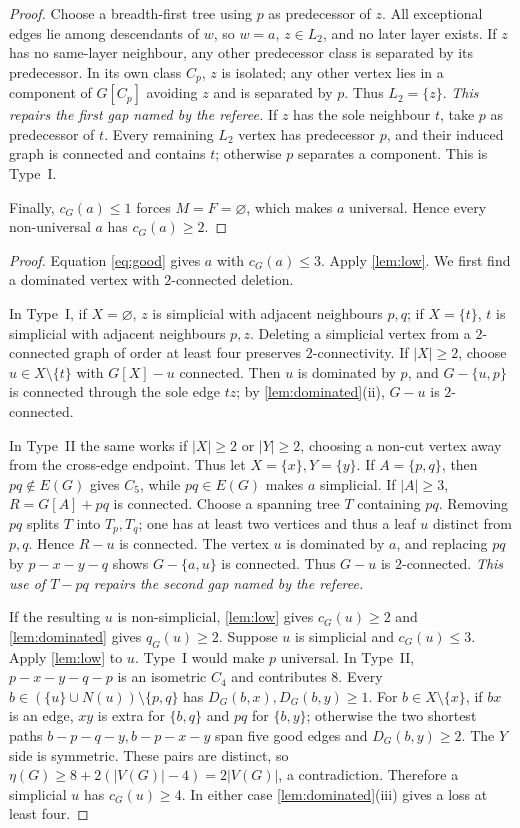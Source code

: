 \documentclass[11pt,a4paper]{article}
\theoremstyle{plain}
\theoremstyle{definition}
\theoremstyle{remark}
\begin{document}
\begin{proof}
Choose a breadth-first tree using $p$ as predecessor of $z$. All
exceptional edges lie among descendants of $w$, so $w=a$, $z\in L_2$,
and no later layer exists. If $z$ has no same-layer neighbour, any other
predecessor class is separated by its predecessor. In its own class
$C_p$, $z$ is isolated; any other vertex lies in a component of
$G[C_p]$ avoiding $z$ and is separated by $p$. Thus $L_2=\{z\}$.
\emph{This repairs the first gap named by the referee.}
If $z$ has the sole neighbour $t$, take $p$ as predecessor of $t$.
Every remaining $L_2$ vertex has predecessor $p$, and their induced
graph is connected and contains $t$; otherwise $p$ separates a component.
This is Type~I.

Finally, $c_G(a)\le1$ forces $M=F=\varnothing$, which makes $a$
universal. Hence every non-universal $a$ has $c_G(a)\ge2$.
\end{proof}

\label{pf:reduction}
\propreduction*
\begin{proof}
Equation \eqref{eq:good} gives $a$ with $c_G(a)\le3$. Apply
\cref{lem:low}. We first find a dominated vertex with $2$-connected
deletion.

In Type~I, if $X=\varnothing$, $z$ is simplicial with adjacent neighbours
$p,q$; if $X=\{t\}$, $t$ is simplicial with adjacent neighbours $p,z$.
Deleting a simplicial vertex from a $2$-connected graph of order at least
four preserves $2$-connectivity. If $|X|\ge2$, choose
$u\in X\setminus\{t\}$ with $G[X]-u$ connected. Then $u$ is dominated by
$p$, and $G-\{u,p\}$ is connected through the sole edge $tz$; by
\cref{lem:dominated}(ii), $G-u$ is $2$-connected.

In Type~II the same works if $|X|\ge2$ or $|Y|\ge2$, choosing a non-cut
vertex away from the cross-edge endpoint. Thus let $X=\{x\},Y=\{y\}$.
If $A=\{p,q\}$, then $pq\notin E(G)$ gives $C_5$, while $pq\in E(G)$
makes $a$ simplicial. If $|A|\ge3$, $R=G[A]+pq$ is connected. Choose a
spanning tree $T$ containing $pq$. Removing $pq$ splits $T$ into
$T_p,T_q$; one has at least two vertices and thus a leaf $u$ distinct
from $p,q$. Hence $R-u$ is connected. The vertex $u$ is dominated by
$a$, and replacing $pq$ by $p-x-y-q$ shows $G-\{a,u\}$ is connected.
Thus $G-u$ is $2$-connected. \emph{This use of $T-pq$ repairs the second
gap named by the referee.}

If the resulting $u$ is non-simplicial, \cref{lem:low} gives
$c_G(u)\ge2$ and \cref{lem:dominated} gives $q_G(u)\ge2$. Suppose $u$ is
simplicial and $c_G(u)\le3$. Apply \cref{lem:low} to $u$. Type~I would
make $p$ universal. In Type~II, $p-x-y-q-p$ is an isometric $C_4$ and
contributes $8$. Every
$b\in(\{u\}\cup N(u))\setminus\{p,q\}$ has
$D_G(b,x),D_G(b,y)\ge1$. For $b\in X\setminus\{x\}$, if $bx$ is an edge,
$xy$ is extra for $\{b,q\}$ and $pq$ for $\{b,y\}$; otherwise the two
shortest paths $b-p-q-y,b-p-x-y$ span five good edges and
$D_G(b,y)\ge2$. The $Y$ side is symmetric. These pairs are distinct, so
$\eta(G)\ge8+2(|V(G)|-4)=2|V(G)|$, a contradiction. Therefore a
simplicial $u$ has $c_G(u)\ge4$. In either case
\cref{lem:dominated}(iii) gives a loss at least four.
\end{proof}
\end{document}
